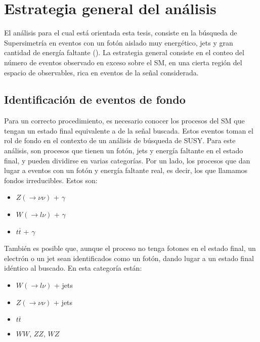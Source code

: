 \chapter{Estrategia general del análisis}



El análisis para el cual está orientada esta tesis, consiste en la búsqueda de Supersimetría en eventos con un fotón aislado muy energético, jets y gran cantidad de energía faltante (). La estrategia general consiste en el conteo del número de eventos observado en exceso sobre el SM, en una cierta región del espacio de observables, rica en eventos de la señal considerada.


\section{Identificación de eventos de fondo}

Para un correcto procedimiento, es necesario conocer los procesos del SM que tengan un estado final equivalente a de la señal buscada. Estos eventos toman el rol de fondo en el contexto de un análisis de búsqueda de SUSY. Para este análisis, son procesos que tienen un fotón, jets y energía faltante en el estado final, y pueden dividirse en varias categorías. Por un lado, los procesos que dan lugar a eventos con un fotón y energía faltante
real, es decir, los que llamamos fondos irreducibles. Estos son:

\begin{itemize}

	\item $Z(\rightarrow \nu\nu)$ + $\gamma$

	\item $W (\rightarrow l\nu)$ + $\gamma$

	\item $t \overline{t}$ + $\gamma$

\end{itemize}

También es posible que, aunque el proceso no tenga fotones en el estado final, un electrón o un jet sean identificados como un fotón, dando lugar a un estado final idéntico al buscado. En esta categoría están:

\begin{itemize}

	\item $W (\rightarrow l\nu)$ + jets

	\item $Z (\rightarrow \nu\nu)$ + jets

	\item $t \overline{t}$

	\item $WW$, $ZZ$, $WZ$

\end{itemize}

